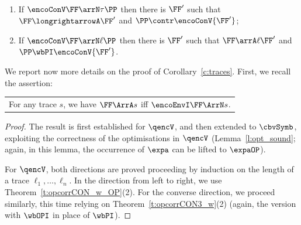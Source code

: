 \begin{theorem} %
\label{t:opcorrCON3}
$ $ \begin{enumerate}

\item If 
$ \encoConV \FF \arrN \tau \PP$ then there is $\FF'$ such that 
$\FF \longrightarrowA \FF'$  and  
$\PP   \contr \encoConV {\FF'}$; 


\item If
$ \encoConV \FF \arrN\ell \PP$
 then there is $\FF'$ such that
 $\FF \arrA\ell \FF'$
and $\PP \wbPI \encoConV {\FF'}$.
\end{enumerate} 
\end{theorem} 
\noindent
We report now more details on the proof of Corollary~\ref{c:traces}.
First, we recall the assertion:

\begin{center}
\begin{tabular}{l}
For any trace $s$, we have 
  $\FF \ArrA s$   iff 
 $ \encoEnvI \FF  \ArrN s$.
\end{tabular} 
\end{center} 


\begin{proof}
The result is first established for 
 $\qencV$, and then extended to 
$\cbvSymb$,  exploiting the correctness of the optimisations 
in  $\qencV$ (Lemma~\ref{l:opt_sound}; again, in this lemma, the occurrence of $\expa$
can be lifted to $\expaOP$).

For  $\qencV$, 
both directions are proved proceeding by induction on the length of a trace 
 $\ell_1, \ldots,   \ell_n $.  
In the direction from left to right, we use 
 Theorem~\ref{t:opcorrCON_w_OP}(2). 
For the converse direction, we 
proceed similarly, this time relying on 
Theorem~\ref{t:opcorrCON3_w}(2) 
 (again, the version with $\wbOPI$ in place of 
 $\wbPI$).
 \end{proof} 




